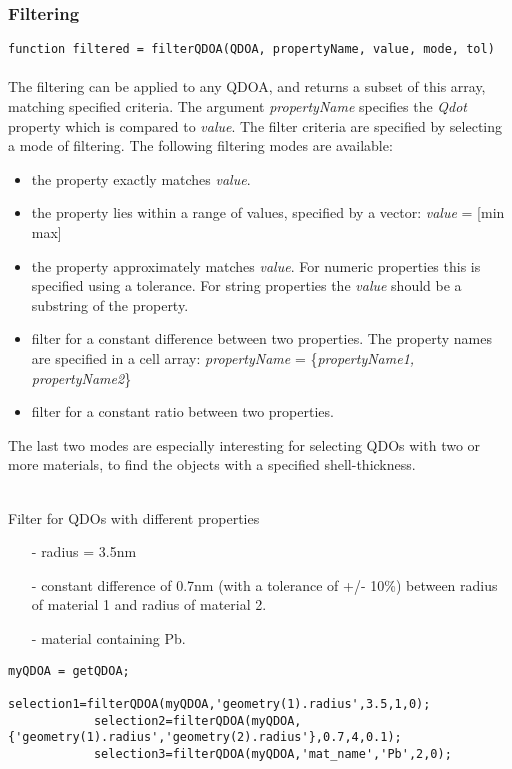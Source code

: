 	\subsubsection{Filtering}
		\lstinline{function filtered = filterQDOA(QDOA, propertyName, value, mode, tol)}\\\\
		The filtering can be applied to any QDOA, and returns a subset of this array, matching specified criteria. The argument \textit{propertyName} 
		specifies the \textit{Qdot} property which is compared to \textit{value}. The filter criteria are specified by selecting a mode of filtering. 
		The following filtering modes are available:\\
		\begin{itemize}
			\item the property exactly matches \textit{value}.
			\item the property lies within a range of values, specified by a vector: \textit{value} = [min max]
			\item the property approximately matches \textit{value}. For numeric properties this is specified using a tolerance. For string properties the \textit{value} 
			should be a substring of the property.
			\item filter for a constant difference between two properties. The property names are specified in a cell array: \textit{propertyName} 
			= \{\textit{propertyName1, propertyName2}\}
			\item filter for a constant ratio between two properties.
		\end{itemize}
		The last two modes are especially interesting for selecting QDOs with two or more materials, to find the objects with a specified shell-thickness.\\
		\\
		\begin{EXAMPLE}
			Filter for QDOs with different properties
			\begin{itemize}
			\item[-] radius = 3.5nm
			\item[-] constant difference of 0.7nm (with a tolerance of +/- 10\%) between radius of material 1 and radius of material 2.
			\item[-] material containing Pb.
			\end{itemize}
			\begin{lstlisting}[frame = none]
			myQDOA = getQDOA;
			selection1=filterQDOA(myQDOA,'geometry(1).radius',3.5,1,0);
			selection2=filterQDOA(myQDOA, {'geometry(1).radius','geometry(2).radius'},0.7,4,0.1);
			selection3=filterQDOA(myQDOA,'mat_name','Pb',2,0); \end{lstlisting}
		\end{EXAMPLE}

